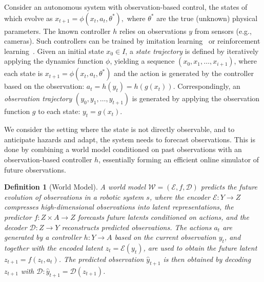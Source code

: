 \documentclass[sigconf]{acmart}
\newtheorem{definition}{Definition}
\begin{document}
Consider an autonomous system with observation-based control, the states of which evolve as $x_{t+1} = \phi(x_t, a_t, \theta^*),$ where $\theta^*$ are the true (unknown) physical parameters. The known controller $h$ relies on observations $y$ from sensors (e.g., cameras). Such controllers can be trained by imitation learning~\cite[]{hussein2017imitation} or reinforcement learning~\cite[]{kaelbling1996reinforcement,lillicrap2015continuous}.
Given an initial state \( x_0 \in I \), a \textit{state trajectory} is defined by iteratively applying the dynamics function \( \phi \), yielding a sequence \( (x_0, x_1, \ldots, x_{i+1}) \), where each state is \( x_{t+1} = \phi(x_t, a_t, \theta^*) \) and the action is generated by the controller based on the observation:  \( a_{t}  = h(y_t) = h(g(x_t)) \). Correspondingly, an \textit{observation trajectory} \( (y_0, y_1, \ldots, y_{t+1}) \) is generated by applying the observation function \( g \) to each state: \( y_t = g(x_t) \). 


We consider the setting where the state is not directly observable, and to anticipate hazards and adapt, the system needs to forecast observations. This is done by combining a world model conditioned on past observations with an observation-based controller $h$, essentially forming an efficient online simulator of future observations. 

\begin{definition}[World Model]
A \emph{world model} $\mathcal{W} = (\mathcal{E}, f, \mathcal{D})$ predicts the future evolution of observations in a robotic system $s$, where the encoder $\mathcal{E}: Y \rightarrow Z$ compresses high-dimensional observations into latent representations, the predictor $f: Z \times A \rightarrow Z$ forecasts future latents conditioned on actions, and the decoder $\mathcal{D}: Z \rightarrow Y$ reconstructs predicted observations. The actions $a_t$ are generated by a controller $h: Y \rightarrow A$ based on the current observation $y_t$, and together with the encoded latent $z_t = \mathcal{E}(y_t)$, are used to obtain the future latent $z_{t+1} = f(z_t, a_t)$. The predicted observation $\hat{y}_{t+1}$ is then obtained by decoding $z_{t+1}$ with $\mathcal{D}: \hat{y}_{t+1} = \mathcal{D}(z_{t+1}) $.
\end{definition}
\end{document}
